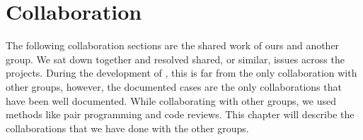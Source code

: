 
\chapter{Collaboration}

The following collaboration sections are the shared work of ours and another group. We sat down together and resolved shared, or similar, issues across the projects. During the development of \giraf, this is far from the only collaboration with other groups, however, the documented cases are the only collaborations that have been well documented. While collaborating with other groups, we used methods like pair programming and code reviews. This chapter will describe the collaborations that we have done with the other groups.





